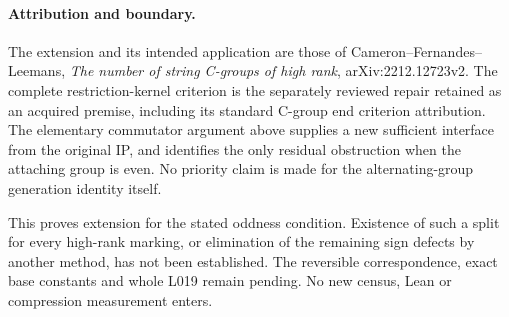 \documentclass[11pt,a4paper]{article}
\begin{document}
\paragraph{Attribution and boundary.}
The extension and its intended application are those of
Cameron--Fernandes--Leemans, \emph{The number of string C-groups
of high rank}, arXiv:2212.12723v2. The complete restriction-kernel
criterion is the separately reviewed repair retained as an acquired
premise, including its standard C-group end criterion attribution.
The elementary commutator argument above supplies a new sufficient
interface from the original IP, and identifies the only residual
obstruction when the attaching group is even. No priority claim is
made for the alternating-group generation identity itself.

This proves extension for the stated oddness condition. Existence
of such a split for every high-rank marking, or elimination of the
remaining sign defects by another method, has not been established.
The reversible correspondence, exact base constants and whole L019
remain pending. No new census, Lean or compression measurement enters.
\end{document}
